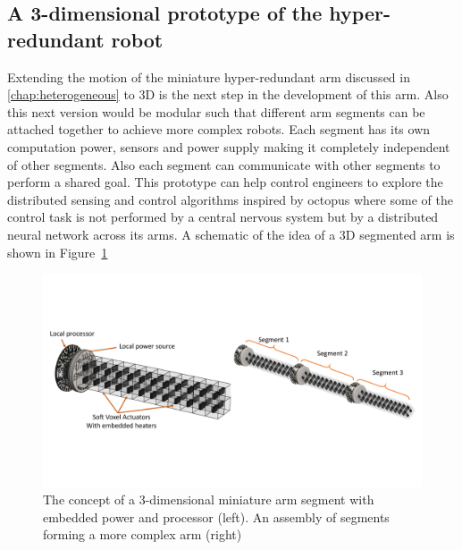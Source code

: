 \subsection{A 3-dimensional prototype of the hyper-redundant robot}
Extending the motion of the miniature hyper-redundant arm discussed in \ref{chap:heterogeneous} to 3D is the next step in the development of this arm. Also this next version would be modular such that different arm segments can be attached together to achieve more complex robots. Each segment has its own computation power, sensors and power supply making it completely independent of other segments. Also each segment can communicate with other segments to perform a shared goal. This prototype can help control engineers to explore the distributed sensing and control algorithms inspired by octopus where some of the control task is not performed by a central nervous system but by a distributed neural network across its arms. A schematic of the idea of a 3D segmented arm is shown in Figure~\ref{fig:3Darm}
\begin{figure}[!t]
\centering
\includegraphics[width=\textwidth]{3Darm.pdf}
    \caption[]{The concept of a 3-dimensional miniature arm segment with embedded power and processor (left). An assembly of segments forming a more complex arm (right)}
    \label{fig:3Darm}
\end{figure}

